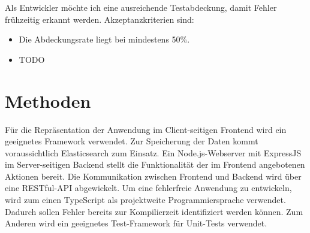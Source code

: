 \documentclass[a4paper, 10pt, conference]{ieeeconf}
\begin{document}
Als Entwickler möchte ich eine ausreichende Testabdeckung,  damit Fehler frühzeitig erkannt werden.  Akzeptanzkriterien sind:
\begin{itemize}
\item Die Abdeckungsrate liegt bei mindestens 50\%.
\item TODO
\end{itemize}

\section{Methoden} \label{s:methoden}
Für die Repräsentation der Anwendung im Client-seitigen Frontend wird ein geeignetes Framework verwendet.  Zur Speicherung der Daten kommt voraussichtlich Elasticsearch zum Einsatz. Ein Node.js-Webserver mit ExpressJS im Server-seitigen Backend stellt die Funktionalität der im Frontend angebotenen Aktionen bereit.  Die Kommunikation zwischen Frontend und Backend wird über eine RESTful-API abgewickelt. Um eine fehlerfreie Anwendung zu entwickeln, wird zum einen TypeScript als projektweite Programmiersprache verwendet. Dadurch sollen Fehler bereits zur Kompilierzeit identifiziert werden können. Zum Anderen wird ein geeignetes Test-Framework für Unit-Tests verwendet.

\printbibliography
\end{document}
